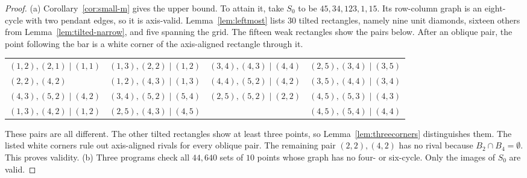 \begin{proof}
(a) Corollary~\ref{cor:small-m} gives the upper bound. To attain it,
take $S_0$ to be $45,\allowbreak 34,\allowbreak 123,\allowbreak 1,\allowbreak 15$.
Its row-column graph is an eight-cycle with two pendant edges, so it is axis-valid. Lemma~\ref{lem:leftmost} lists $30$ tilted rectangles, namely
nine unit diamonds, sixteen others from Lemma~\ref{lem:tilted-narrow},
and five spanning the grid. The fifteen weak rectangles show the pairs
below. After an oblique pair, the point following the bar is a white
corner of the axis-aligned rectangle through it.
\begin{center}\footnotesize
\begin{tabular}{@{}llll@{}}
$(1,2),(2,1)\mid(1,1)$ & $(1,3),(2,2)\mid(1,2)$ & $(3,4),(4,3)\mid(4,4)$ & $(2,5),(3,4)\mid(3,5)$ \\
$(2,2),(4,2)$ & $(1,2),(4,3)\mid(1,3)$ & $(4,4),(5,2)\mid(4,2)$ & $(3,5),(4,4)\mid(3,4)$ \\
$(4,3),(5,2)\mid(4,2)$ & $(3,4),(5,2)\mid(5,4)$ & $(2,5),(5,2)\mid(2,2)$ & $(4,5),(5,3)\mid(4,3)$ \\
$(1,3),(4,2)\mid(1,2)$ & $(2,5),(4,3)\mid(4,5)$ & & $(4,5),(5,4)\mid(4,4)$ \\
\end{tabular}
\end{center}
These pairs are all different. The other tilted rectangles show at least
three points, so Lemma~\ref{lem:threecorners} distinguishes them.
The listed white corners rule out axis-aligned rivals for every oblique
pair. The remaining pair $(2,2),(4,2)$ has no rival because
$B_2\cap B_4=\emptyset$. This proves validity.
(b) Three programs check all $44{,}640$ sets of $10$ points whose graph
has no four- or six-cycle. Only the images of $S_0$ are valid.
\end{proof}
